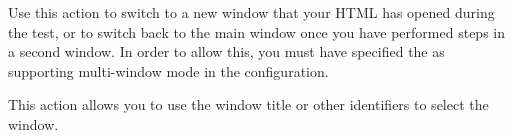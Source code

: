 
Use this action to switch to a new window that your HTML \gdaut{} has opened during the test, or to switch back to the main window once you have performed steps in a second window. In order to allow this, you must have specified the \gdaut{} as supporting multi-window mode in the \gdaut{} configuration. 

This action allows you to use the window title or other identifiers to select the window.
